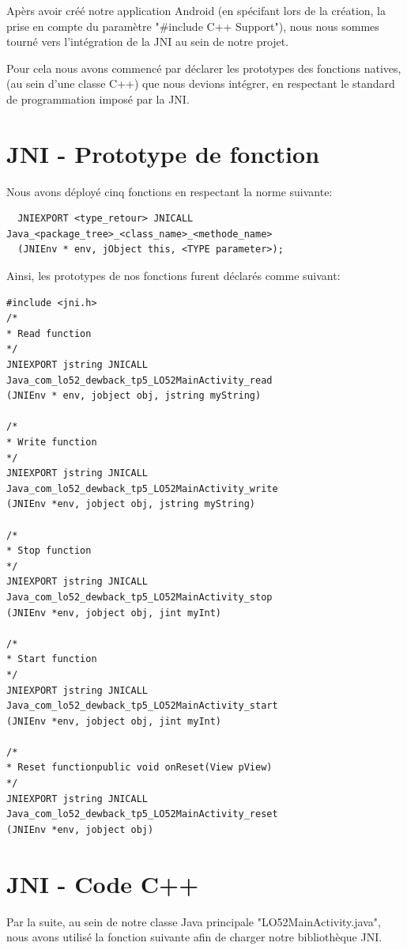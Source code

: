 \documentclass[french,a4paper,12pt]{report}
\begin{document}
Apèrs avoir créé notre application Android (en spécifant lors de la création,
la prise en compte du paramètre "#include C++ Support"), nous nous sommes tourné vers
l'intégration de la JNI au sein de notre projet.

Pour cela nous avons commencé par déclarer les prototypes des fonctions natives,
(au sein d'une classe C++) que nous devions intégrer, en respectant le standard
de programmation imposé par la JNI.

\section{JNI - Prototype de fonction}

Nous avons déployé cinq fonctions en respectant la norme suivante:

\begin{lstlisting}
  JNIEXPORT <type_retour> JNICALL Java_<package_tree>_<class_name>_<methode_name>
  (JNIEnv * env, jObject this, <TYPE parameter>);
\end{lstlisting}

Ainsi, les prototypes de nos fonctions furent déclarés comme suivant:

\begin{lstlisting}
#include <jni.h>
/*
* Read function
*/
JNIEXPORT jstring JNICALL Java_com_lo52_dewback_tp5_LO52MainActivity_read
(JNIEnv * env, jobject obj, jstring myString)

/*
* Write function
*/
JNIEXPORT jstring JNICALL Java_com_lo52_dewback_tp5_LO52MainActivity_write
(JNIEnv *env, jobject obj, jstring myString)

/*
* Stop function
*/
JNIEXPORT jstring JNICALL Java_com_lo52_dewback_tp5_LO52MainActivity_stop
(JNIEnv *env, jobject obj, jint myInt)

/*
* Start function
*/
JNIEXPORT jstring JNICALL Java_com_lo52_dewback_tp5_LO52MainActivity_start
(JNIEnv *env, jobject obj, jint myInt)

/*
* Reset functionpublic void onReset(View pView)
*/
JNIEXPORT jstring JNICALL Java_com_lo52_dewback_tp5_LO52MainActivity_reset
(JNIEnv *env, jobject obj)
\end{lstlisting}

\section{JNI - Code C++}

Par la suite,
au sein de notre classe Java principale "LO52MainActivity.java", nous avons
utilisé la fonction suivante afin de charger notre bibliothèque JNI.
\end{document}
